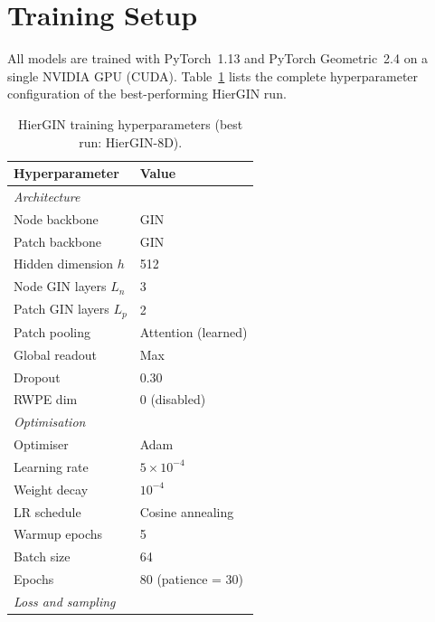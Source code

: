 \section{Training Setup}
\label{sec:training}

All models are trained with PyTorch~1.13 and PyTorch Geometric~2.4 on a
single NVIDIA GPU (CUDA).
Table~\ref{tab:hyperparams} lists the complete hyperparameter configuration
of the best-performing HierGIN run.

\begin{table}[h]
  \centering
  \caption{HierGIN training hyperparameters (best run: HierGIN-8D).}
  \label{tab:hyperparams}
  \begin{tabular}{ll}
    \toprule
    \textbf{Hyperparameter} & \textbf{Value} \\
    \midrule
    \multicolumn{2}{l}{\textit{Architecture}} \\
    \quad Node backbone          & GIN \\
    \quad Patch backbone         & GIN \\
    \quad Hidden dimension $h$   & 512 \\
    \quad Node GIN layers $L_n$  & 3 \\
    \quad Patch GIN layers $L_p$ & 2 \\
    \quad Patch pooling          & Attention (learned) \\
    \quad Global readout         & Max \\
    \quad Dropout                & 0.30 \\
    \quad RWPE dim               & 0 (disabled) \\
    \midrule
    \multicolumn{2}{l}{\textit{Optimisation}} \\
    \quad Optimiser              & Adam \\
    \quad Learning rate          & $5 \times 10^{-4}$ \\
    \quad Weight decay           & $10^{-4}$ \\
    \quad LR schedule            & Cosine annealing \\
    \quad Warmup epochs          & 5 \\
    \quad Batch size             & 64 \\
    \quad Epochs                 & 80 (patience = 30) \\
    \midrule
    \multicolumn{2}{l}{\textit{Loss and sampling}} \\

\end{tabular}
\end{table}

